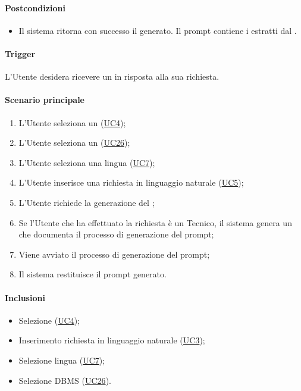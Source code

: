 \paragraph*{Postcondizioni}
\begin{itemize}
  \item Il sistema ritorna con successo il  generato. Il prompt contiene i  estratti dal .
\end{itemize}

\paragraph*{Trigger}
L'Utente desidera ricevere un  in risposta alla sua richiesta.

\paragraph*{Scenario principale}
\begin{enumerate}
  \item L'Utente seleziona un (\hyperref[UC4]{UC4});
  \item L'Utente seleziona un  (\hyperref[UC26]{UC26});
  \item L'Utente seleziona una lingua (\hyperref[UC7]{UC7});
  \item L'Utente inserisce una richiesta in linguaggio naturale (\hyperref[UC5]{UC5});
  \item L'Utente richiede la generazione del ;
  \item Se l'Utente che ha effettuato la richiesta è un Tecnico, il sistema genera un  che documenta il processo di generazione del prompt;
  \item Viene avviato il processo di generazione del prompt;
  \item Il sistema restituisce il prompt generato.
\end{enumerate}

\paragraph*{Inclusioni}
\begin{itemize}
  \item Selezione  (\hyperref[UC4]{UC4});
  \item Inserimento richiesta in linguaggio naturale (\hyperref[UC3]{UC3});
  \item Selezione lingua (\hyperref[UC7]{UC7});
  \item Selezione DBMS (\hyperref[UC26]{UC26}).
\end{itemize}

